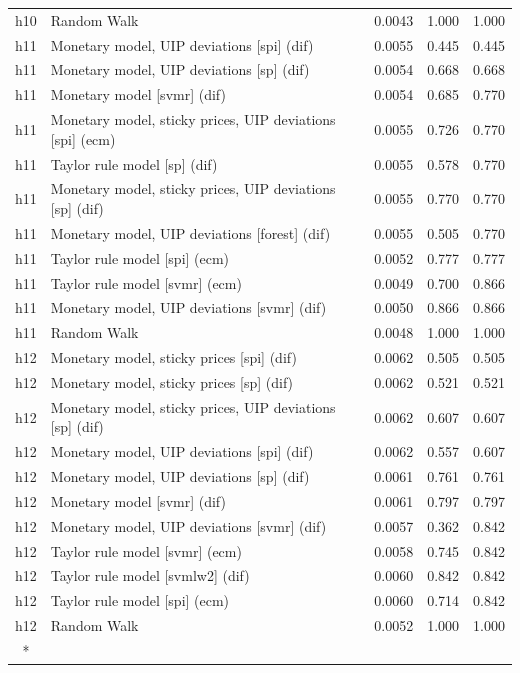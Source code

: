 \begin{ThreePartTable}
\begin{longtable}[t]{cp{5.5cm}ccc}
h10 & \raggedright Random Walk & 0.0043 & 1.000 & 1.000\\
\addlinespace
h11 & \raggedright Monetary model, UIP deviations [spi] (dif) & 0.0055 & 0.445 & 0.445\\
h11 & \raggedright Monetary model, UIP deviations [sp] (dif) & 0.0054 & 0.668 & 0.668\\
h11 & \raggedright Monetary model [svmr] (dif) & 0.0054 & 0.685 & 0.770\\
h11 & \raggedright Monetary model, sticky prices, UIP deviations [spi] (ecm) & 0.0055 & 0.726 & 0.770\\
h11 & \raggedright Taylor rule model [sp] (dif) & 0.0055 & 0.578 & 0.770\\
h11 & \raggedright Monetary model, sticky prices, UIP deviations [sp] (dif) & 0.0055 & 0.770 & 0.770\\
h11 & \raggedright Monetary model, UIP deviations [forest] (dif) & 0.0055 & 0.505 & 0.770\\
h11 & \raggedright Taylor rule model [spi] (ecm) & 0.0052 & 0.777 & 0.777\\
h11 & \raggedright Taylor rule model [svmr] (ecm) & 0.0049 & 0.700 & 0.866\\
h11 & \raggedright Monetary model, UIP deviations [svmr] (dif) & 0.0050 & 0.866 & 0.866\\
h11 & \raggedright Random Walk & 0.0048 & 1.000 & 1.000\\
\addlinespace
h12 & \raggedright Monetary model, sticky prices [spi] (dif) & 0.0062 & 0.505 & 0.505\\
h12 & \raggedright Monetary model, sticky prices [sp] (dif) & 0.0062 & 0.521 & 0.521\\
h12 & \raggedright Monetary model, sticky prices, UIP deviations [sp] (dif) & 0.0062 & 0.607 & 0.607\\
h12 & \raggedright Monetary model, UIP deviations [spi] (dif) & 0.0062 & 0.557 & 0.607\\
h12 & \raggedright Monetary model, UIP deviations [sp] (dif) & 0.0061 & 0.761 & 0.761\\
h12 & \raggedright Monetary model [svmr] (dif) & 0.0061 & 0.797 & 0.797\\
h12 & \raggedright Monetary model, UIP deviations [svmr] (dif) & 0.0057 & 0.362 & 0.842\\
h12 & \raggedright Taylor rule model [svmr] (ecm) & 0.0058 & 0.745 & 0.842\\
h12 & \raggedright Taylor rule model [svmlw2] (dif) & 0.0060 & 0.842 & 0.842\\
h12 & \raggedright Taylor rule model [spi] (ecm) & 0.0060 & 0.714 & 0.842\\
h12 & \raggedright Random Walk & 0.0052 & 1.000 & 1.000\\*
\end{longtable}
\end{ThreePartTable}
\endgroup{}
